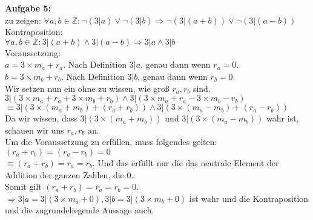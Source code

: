 \documentclass[a4paper]{scrartcl}
\begin{document}
	\begin{flushleft}
		\textbf{Aufgabe 5:}\\		
		zu zeigen: $\forall a,b\in \mathbb{Z}: \neg(3|a) \vee \neg(3|b) \Rightarrow \neg(3|(a+b)) \vee \neg(3|(a-b))$\\ 
		Kontraposition:\\
		$\forall a,b\in \mathbb{Z}: 3|(a+b) \wedge 3|(a-b) \Rightarrow 3|a \wedge 3|b$\\[1em]
		Voraussetzung:\\
		$a = 3\times m_a + r_a$. Nach Definition $3|a$, genau dann wenn $r_a = 0$.\\ 
		$b = 3\times m_b + r_b$. Nach Definition $3|b$, genau dann wenn $r_b = 0$.\\[1em]
		Wir setzen nun ein ohne zu wissen, wie groß $r_a,r_b$ sind.\\
		$3|(3\times m_a + r_a + 3\times m_b + r_b) \wedge 3|(3\times m_a + r_a - 3\times m_b - r_b)$\\
		$\equiv 3|(3\times (m_a + m_b) + (r_a + r_b)) \wedge 3|(3\times (m_a - m_b) + (r_a - r_b))$\\
		Da wir wissen, dass $3|(3\times (m_a + m_b))$ und $3|(3\times (m_a - m_b))$ wahr ist, schauen wir uns $r_a,r_b$ an.\\
		Um die Voraussetzung zu erfüllen, muss folgendes gelten: $(r_a + r_b) = (r_a - r_b) = 0$\\
		$\equiv (r_a + r_b) = r_a = r_b$. Und das erfüllt nur die das neutrale Element der Addition der ganzen Zahlen, die $0$.\\
		Somit gilt $(r_a + r_b) = r_a = r_b = 0$.\\
		$\Rightarrow 3|a = 3|(3\times m_a + 0), 3|b = 3|(3\times m_b + 0)$ ist wahr und die Kontraposition und die zugrundeliegende Aussage auch.
		
	\end{flushleft}
\end{document}
